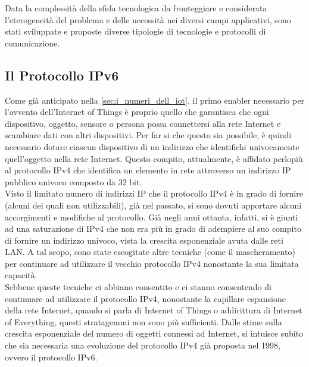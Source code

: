 Data la complessità della sfida tecnologica da fronteggiare e considerata l'eterogeneità del problema e delle necessità nei diversi campi applicativi,
sono stati sviluppate e proposte diverse tipologie di tecnologie e protocolli di comunicazione. \\

\subsection{Il Protocollo IPv6}
Come già anticipato nella \autoref{sec:i_numeri_dell_iot}, il primo enabler necessario per l'avvento dell'Internet of Things è proprio quello che garantisca che ogni dispositivo, oggetto, sensore o persona possa connettersi alla rete Internet e scambiare dati con altri dispositivi. Per far si che questo sia possibile, è quindi necessario dotare ciascun dispositivo di un indirizzo che identifichi univocamente quell'oggetto nella rete Internet. Questo compito, attualmente, è affidato perlopiù al protocollo IPv4 che identifica un elemento in rete attraverso un indirizzo IP pubblico univoco composto da 32 bit.\\ Visto il limitato numero di indirizzi IP che il protocollo IPv4 è in grado di fornire (alcuni dei quali non utilizzabili), già nel passato, si sono dovuti apportare alcuni accorgimenti e modifiche al protocollo. 
Già negli anni ottanta, infatti, si è giunti ad una saturazione di IPv4 che non era più in grado di adempiere al suo compito di fornire un indirizzo univoco, vista la crescita esponenziale avuta dalle reti LAN.
A tal scopo, sono state escogitate altre tecniche (come il mascheramento) per continuare ad utilizzare il vecchio protocollo IPv4 nonostante la sua limitata capacità.\\
Sebbene queste tecniche ci abbiano consentito e ci stanno consentendo di continuare ad utilizzare il protocollo IPv4, nonostante la capillare espansione della rete Internet, quando si parla di Internet of Things o addirittura di Internet of Everything, questi stratagemmi non sono più sufficienti.
Dalle stime sulla crescita esponenziale del numero di oggetti connessi ad Internet, si intuisce subito che sia necessaria una evoluzione del protocollo IPv4 già proposta nel 1998, ovvero il protocollo IPv6.
